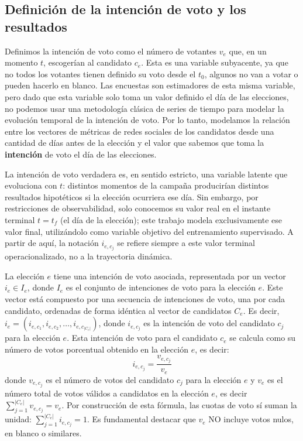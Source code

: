 \subsection {Definición de la intención de voto y los resultados}

Definimos la intención de voto como el número de votantes $v_{e}$ que, en un momento $t$, escogerían al candidato $c_e$. Esta es una variable subyacente, ya que no todos los votantes tienen definido su voto desde el $t_0$, algunos no van a votar o pueden hacerlo en blanco. Las encuestas son estimadores de esta misma variable, pero dado que esta variable solo toma un valor definido el día de las elecciones, no podemos usar una metodología clásica de series de tiempo para modelar la evolución temporal de la intención de voto. Por lo tanto, modelamos la relación entre los vectores de métricas de redes sociales de los candidatos desde una cantidad de días antes de la elección y el valor que sabemos que toma la \textbf{intención} de voto el día de las elecciones.

La intención de voto verdadera es, en sentido estricto, una variable latente que evoluciona con $t$: distintos momentos de la campaña producirían distintos resultados hipotéticos si la elección ocurriera ese día. Sin embargo, por restricciones de observabilidad, solo conocemos su valor real en el instante terminal $t = t_f$ (el día de la elección); este trabajo modela exclusivamente ese valor final, utilizándolo como variable objetivo del entrenamiento supervisado. A partir de aquí, la notación $i_{e,c_j}$ se refiere siempre a este valor terminal operacionalizado, no a la trayectoria dinámica.

La elección $e$ tiene una intención de voto asociada, representada por un vector $i_e \in I_e$, donde $I_e$ es el conjunto de intenciones de voto para la elección $e$. Este vector está compuesto por una secuencia de intenciones de voto, una por cada candidato, ordenadas de forma idéntica al vector de candidatos $C_e$. Es decir, $i_e = (i_{e,c_1}, i_{e,c_2}, \dots, i_{e,c_{|C_e|}})$, donde $i_{e,c_j}$ es la intención de voto del candidato $c_j$ para la elección $e$.
Esta intención de voto para el candidato $c_e$ se calcula como su número de votos porcentual obtenido en la elección $e$, es decir: $$i_{e,c_j} = \frac{v_{e,c_j}}{v_e} $$ donde $v_{e,c_j}$ es el número de votos del candidato $c_j$ para la elección $e$ y $v_e$ es el número total de votos válidos a candidatos en la elección $e$, es decir $\sum_{j=1}^{|C_e|} v_{e,c_j} = v_e$. Por construcción de esta fórmula, las cuotas de voto sí suman la unidad: $\sum_{j=1}^{|C_e|} i_{e,c_j} = 1$. Es fundamental destacar que $v_e$ NO incluye votos nulos, en blanco o similares.


